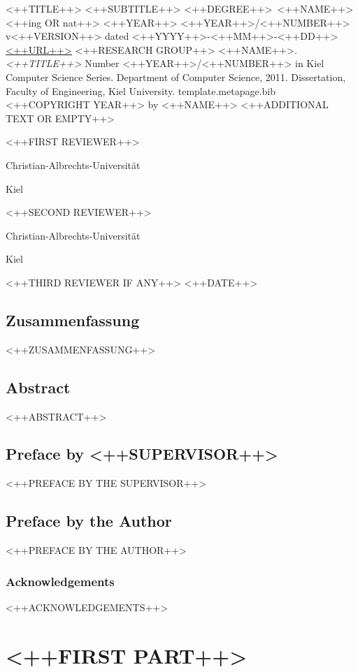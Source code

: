 \documentclass[10pt]{book}
\begin{document}
\frontmatter
\disstitlepage%
{<++TITLE++>}%
{<++SUBTITLE++>}%
{<++DEGREE++>~<++NAME++>}%
{<++ing OR nat++>}%
{<++YEAR++>}
\metapage%
{<++YEAR++>/<++NUMBER++> v<++VERSION++> dated <++YYYY++>-<++MM++>-<++DD++>}%
{\url{<++URL++>}}%
{<++RESEARCH GROUP++>}%
{<++NAME++>.
\textit{<++TITLE++>}
Number <++YEAR++>/<++NUMBER++> in Kiel Computer Science Series.
Department of Computer Science, 2011.
Dissertation, Faculty of Engineering,
Kiel University.}%
{template.metapage.bib}%
{<++COPYRIGHT YEAR++> by <++NAME++>}%
{<++ADDITIONAL TEXT OR EMPTY++>}

\dissreviewerpage%
{<++FIRST REVIEWER++> \par Christian-Albrechts-Universit\"at \par Kiel}%
{<++SECOND REVIEWER++> \par Christian-Albrechts-Universit\"at \par Kiel}%
{<++THIRD REVIEWER IF ANY++>}%
{<++DATE++>}%

\chapter*{Zusammenfassung}
<++ZUSAMMENFASSUNG++>

\chapter*{Abstract}
<++ABSTRACT++>

\chapter{Preface by <++SUPERVISOR++>} %
<++PREFACE BY THE SUPERVISOR++>

\chapter{Preface by the Author}
<++PREFACE BY THE AUTHOR++>

\section*{Acknowledgements}
<++ACKNOWLEDGEMENTS++>

\tableofcontents
\listoffigures
\listoftables
\mainmatter

\part{<++FIRST PART++>}
\end{document}
